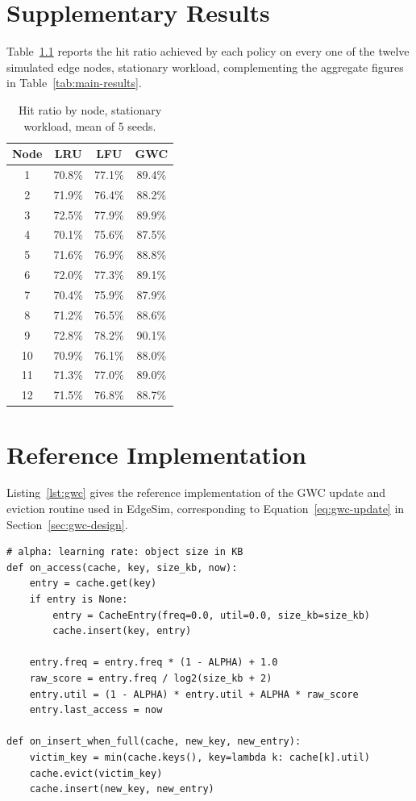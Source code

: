 \chapter{Supplementary Results}
\label{app:results}

Table~\ref{tab:per-node} reports the hit ratio achieved by each policy on every one of the
twelve simulated edge nodes, stationary workload, complementing the aggregate figures in
Table~\ref{tab:main-results}.

\begin{table}[h]
  \centering
  \caption{Hit ratio by node, stationary workload, mean of 5 seeds.}
  \label{tab:per-node}
  \begin{tabular}{@{}cccc@{}}
    \toprule
    \textbf{Node} & \textbf{LRU} & \textbf{LFU} & \textbf{GWC} \\
    \midrule
    1  & 70.8\% & 77.1\% & 89.4\% \\
    2  & 71.9\% & 76.4\% & 88.2\% \\
    3  & 72.5\% & 77.9\% & 89.9\% \\
    4  & 70.1\% & 75.6\% & 87.5\% \\
    5  & 71.6\% & 76.9\% & 88.8\% \\{}
    6  & 72.0\% & 77.3\% & 89.1\% \\
    7  & 70.4\% & 75.9\% & 87.9\% \\
    8  & 71.2\% & 76.5\% & 88.6\% \\
    9  & 72.8\% & 78.2\% & 90.1\% \\
    10 & 70.9\% & 76.1\% & 88.0\% \\
    11 & 71.3\% & 77.0\% & 89.0\% \\
    12 & 71.5\% & 76.8\% & 88.7\% \\
    \bottomrule
  \end{tabular}
\end{table}

\chapter{Reference Implementation}
\label{app:code}

Listing~\ref{lst:gwc} gives the reference implementation of the GWC update and eviction
routine used in EdgeSim, corresponding to Equation~\ref{eq:gwc-update} in
Section~\ref{sec:gwc-design}.

\begin{lstlisting}[caption={Reference GWC update and eviction routine.}, label={lst:gwc}]
# alpha: learning rate: object size in KB
def on_access(cache, key, size_kb, now):
    entry = cache.get(key)
    if entry is None:
        entry = CacheEntry(freq=0.0, util=0.0, size_kb=size_kb)
        cache.insert(key, entry)

    entry.freq = entry.freq * (1 - ALPHA) + 1.0
    raw_score = entry.freq / log2(size_kb + 2)
    entry.util = (1 - ALPHA) * entry.util + ALPHA * raw_score
    entry.last_access = now

def on_insert_when_full(cache, new_key, new_entry):
    victim_key = min(cache.keys(), key=lambda k: cache[k].util)
    cache.evict(victim_key)
    cache.insert(new_key, new_entry)
\end{lstlisting}
